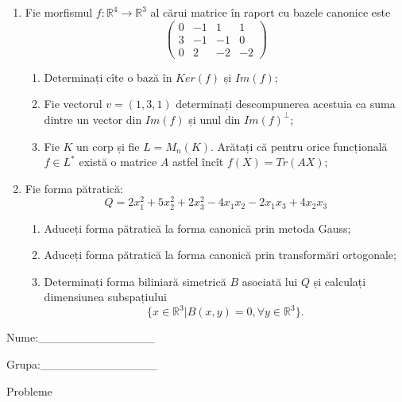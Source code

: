 \documentclass{article}
\begin{document}
\begin{enumerate}
 \item Fie morfismul $f:\mathbb{R}^4 \to \mathbb{R}^3$ al cărui matrice în raport cu bazele canonice este
$$\begin{pmatrix}
0&-1&1&1\\
3&-1&-1&0\\
0&2&-2&-2
\end{pmatrix}$$

\begin{enumerate}
\item Determinați cîte o bază în $Ker(f)$ și $Im(f)$;
\item Fie vectorul $v=(1,3,1)$ determinați descompunerea acestuia ca suma dintre un vector din $Im(f)$ și unul din $Im(f)^\perp$;
\item Fie $K$ un corp și fie $L=M_n(K)$. Arătați că pentru orice funcțională $f \in L^*$ există o matrice $A$ astfel încît $f(X)=Tr(AX)$;
\end{enumerate}
\item Fie forma pătratică:
$$Q= 2x_1^2+5x_2^2+2x_3^2-4x_1x_2-2x_1x_3+4x_2x_3$$

\begin{enumerate}
\item Aduceți forma pătratică la forma canonică prin metoda Gauss;
\item Aduceți forma pătratică la forma canonică prin transformări ortogonale;
\item Determinați forma biliniară simetrică $B$ asociată lui $Q$ și calculați dimensiunea subspațiului
$$\{x \in \mathbb{R}^3 | B(x,y)=0,\forall y \in \mathbb{R}^3\}.$$

\end{enumerate}
\end{enumerate}
\newpage
\begin{flushright}
Nume:\_\_\_\_\_\_\_\_\_\_\_\_\_\_
 
 
Grupa:\_\_\_\_\_\_\_\_\_\_\_\_\_\_
\end{flushright}
\begin{center}
\vspace{2cm}
{\Large Probleme}
\vspace{2cm}
\end{center}
\end{document}
